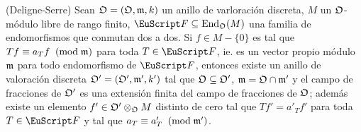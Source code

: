 \documentclass[../../tesis_maestria]{subfiles}
\begin{document}
\begin{lema}\label{lem:delignserre}%
    (Deligne-Serre) Sean $\mathfrak{O}=(\mathfrak{O},\mathfrak{m},k)$ un anillo de varloraci\'on discreta, $M$ un
    $\mathfrak{O}$-m\'odulo libre de rango finito, $\Ff\subseteq\End_{\fO}(M)$ una familia de endomorfismos
    que conmutan dos a dos. Si $f\in M-\{0\}$ es tal que $Tf\equiv a_Tf\;\;(\mathrm{mod}\; \mathfrak{m})$ para toda
    $T\in\Ff$, ie. es un vector propio m\'odulo $\mathfrak{m}$ para todo endomorfismo de $\Ff$, entonces
    existe un anillo de valoraci\'on discreta $\mathfrak{O}'=(\mathfrak{O}',\mathfrak{m}',k')$ tal que $\mathfrak{O}\subseteq\mathfrak{O}'$,
    $\mathfrak{m}=\mathfrak{O}\cap\mathfrak{m}'$ y el campo de fracciones de $\mathfrak{O}'$ es una extensi\'on finita del campo de
    fracciones de $\mathfrak{O}$; adem\'as existe un elemento $f'\in\mathfrak{O}'\otimes_{\mathfrak{O}}M$ distinto de cero
    tal que $Tf'=a'_{T}f'$ para toda $T\in\Ff$ y tal que $a_T\equiv a'_T\;\;(\mathrm{mod}\; \mathfrak{m}')$.
\end{lema}
\begin{comment}
  Gracias a que la extensi\'on de campos de fracciones es finita, el ideal maximal $\m'$ se
  contrae a $\m$ y que $a_T\equiv a'_T\Mod{\m'}$, la reducci\'on 1 se puede aplicar a $f'$. Esto
  concluir\'ia la reducci\'on 3.
\end{comment}
\end{document}
